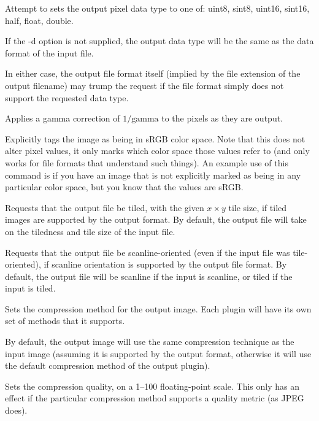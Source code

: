 Attempt to sets the output pixel data type to one of: {\cf uint8}, 
{\cf sint8}, {\cf uint16}, {\cf sint16}, {\cf half}, {\cf float}, 
{\cf double}.

If the {\cf -d} option is not supplied, the output data type will
be the same as the data format of the input file.

In either case, the output file format itself (implied by the file
extension of the output filename) may trump the request if the file
format simply does not support the requested data type.
\apiend

Applies a gamma correction of $1/\mathrm{gamma}$ to the pixels as they
are output.
\apiend

Explicitly tags the image as being in sRGB color space.  Note that this
does not alter pixel values, it only marks which color space those
values refer to (and only works for file formats that understand such
things).  An example use of this command is if you have an image 
that is not explicitly marked as being in any particular color space,
but you know that the values are sRGB.
\apiend

Requests that the output file be tiled, with the given $x \times y$ 
tile size, if tiled images are supported by the output format.
By default, the output file will take on the tiledness and tile size
of the input file.
\apiend

Requests that the output file be scanline-oriented (even if the input
file was tile-oriented), if scanline orientation is supported by the
output file format.  By default, the output file will be scanline
if the input is scanline, or tiled if the input is tiled.
\apiend

Sets the compression method for the output image.  Each \ImageOutput
plugin will have its own set of methods that it supports.

By default, the output image will use the same compression technique as
the input image (assuming it is supported by the output format,
otherwise it will use the default compression method of the output
plugin).  
\apiend

Sets the compression quality, on a 1--100 floating-point scale.
This only has an effect if the particular compression method supports
a quality metric (as JPEG does).
\apiend

